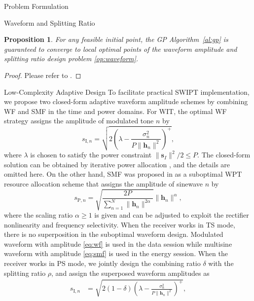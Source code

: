 \documentclass[journal]{IEEEtran}
\newtheorem{proposition}{Proposition}
\begin{document}
\begin{section}{Problem Formulation}
\begin{subsection}{Waveform and Splitting Ratio}
			\begin{proposition}\label{pr:gp}
				For any feasible initial point, the GP Algorithm~\ref{al:gp} is guaranteed to converge to local optimal points of the waveform amplitude and splitting ratio design problem \eqref{op:waveform}.
			\end{proposition}

			\begin{proof}\label{pf:gp}
				Please refer to \cite{Clerckx2016a,Clerckx2018b}.
			\end{proof}
		\end{subsection}


		\begin{subsection}{Low-Complexity Adaptive Design}
			To facilitate practical SWIPT implementation, we propose two closed-form adaptive waveform amplitude schemes by combining WF and SMF in the time and power domains. For WIT, the optimal WF strategy assigns the amplitude of modulated tone $n$ by
			\begin{equation}\label{eq:wf}
				s_{\mathrm{I}, n} = \sqrt{2\left(\lambda - \frac{\sigma_n^2}{P \lVert{\boldsymbol{h}_n}\rVert^2}\right)^+},
			\end{equation}
			where $\lambda$ is chosen to satisfy the power constraint $\lVert{\boldsymbol{s}_I}\rVert^2 / 2 \le P$. The closed-form solution can be obtained by iterative power allocation \cite{Tse2005}, and the details are omitted here. On the other hand, SMF was proposed in \cite{Clerckx2017} as a suboptimal WPT resource allocation scheme that assigns the amplitude of sinewave $n$ by
			\begin{equation}\label{eq:smf}
				s_{\mathrm{P}, n} = \sqrt{\frac{2 P}{\sum_{n=1}^N \lVert{\boldsymbol{h}_n \rVert^{2 \alpha}}}}\lVert{\boldsymbol{h}_n}\rVert^\alpha,
			\end{equation}
			where the scaling ratio $\alpha \ge 1$ is given and can be adjusted to exploit the rectifier nonlinearity and frequency selectivity. When the receiver works in TS mode, there is no superposition in the suboptimal waveform design. Modulated waveform with amplitude \eqref{eq:wf} is used in the data session while multisine waveform with amplitude \eqref{eq:smf} is used in the energy session. When the receiver works in PS mode, we jointly design the combining ratio $\delta$ with the splitting ratio $\rho$, and assign the superposed waveform amplitudes as
			\begin{align}
				s_{\mathrm{I}, n} &= \sqrt{2(1 - \delta)\left(\lambda - \frac{\sigma_n^2}{P \lVert{\boldsymbol{h}_n}\rVert^2}\right)^+}, \label{eq:s_i}\\

\end{align}
\end{subsection}
\end{section}
\end{document}

